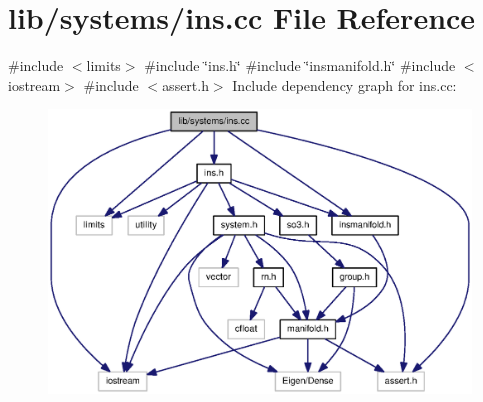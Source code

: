 \section{lib/systems/ins.cc \-File \-Reference}
\label{ins_8cc}
{\ttfamily \#include $<$limits$>$}\*
{\ttfamily \#include \char`\"{}ins.\-h\char`\"{}}\*
{\ttfamily \#include \char`\"{}insmanifold.\-h\char`\"{}}\*
{\ttfamily \#include $<$iostream$>$}\*
{\ttfamily \#include $<$assert.\-h$>$}\*
\-Include dependency graph for ins.\-cc\-:
\nopagebreak
\begin{figure}[H]
\begin{center}
\leavevmode
\includegraphics[width=350pt]{ins_8cc__incl}
\end{center}
\end{figure}
